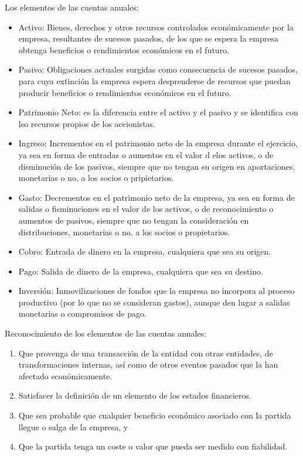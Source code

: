 Los elementos de las cuentas anuales:
\begin{itemize}
    \item Activo: Bienes, derechos y otros recursos controlados económicamente por la empresa, resultantes de sucesos pasados, de los que se espera la empresa obtenga beneficios o rendimientos económicos en el futuro.
    \item Pasivo: Obligaciones actuales surgidas como consecuencia de sucesos pasados, para cuya extinción la empresa espera desprenderse de recursos que puedan producir beneficios o rendimientos económicos en el futuro.
    \item Patrimonio Neto: es la diferencia entre el activo y el pasivo y se identifica con lso recursos propios de los accionistas.
    \item Ingreso: Incrementos en el patrimonio neto de la empresa durante el ejercicio, ya sea en forma de entradas o aumentos en el valor d elos activos, o de disminución de los pasivos, siempre que no tengan su origen en aportaciones, monetarias o no, a los socios o pripietarios.
    \item Gasto: Decrementos en el patrimonio neto de la empresa, ya sea en forma de salidas o fisminuciones en el valor de los activos, o de reconocimiento o aumentos de pasivos, siempre que no tengan la consideración en distribuciones, monetarias o no, a los socios o propietarios.
    \item Cobro: Entrada de dinero en la empresa, cualquiera que sea su origen.
    \item Pago: Salida de dinero de la empresa, cualquiera que sea su destino.
    \item Inversión: Inmovilizaciones de fondos que la empresa no incorpora al proceso productivo (por lo que no se consideran gastos), aunque den lugar a salidas monetarias o compromisos de pago.
\end{itemize}

Reconocimiento de los elementos de las cuentas anuales:
\begin{enumerate}
    \item Que provenga de una transacción de la entidad con otras entidades, de transformaciones internas, así como de otros eventos pasados que la han afectado económicamente.
    \item Satisfacer la definición de un elemento de los estados financieros.
    \item Que sea probable que cualquier beneficio económico asociado con la partida llegue o salga de la empresa, y
    \item Que la partida tenga un coste o valor que pueda ser medido con fiabilidad.
\end{enumerate}


